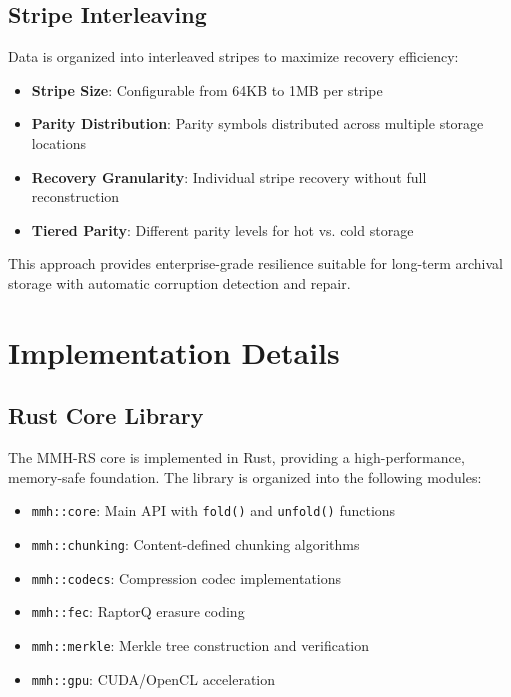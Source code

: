 \documentclass[11pt,a4paper]{article}
\begin{document}
	\subsection{Stripe Interleaving}
	
	Data is organized into interleaved stripes to maximize recovery efficiency:
	\begin{itemize}
		\item \textbf{Stripe Size}: Configurable from 64KB to 1MB per stripe
		\item \textbf{Parity Distribution}: Parity symbols distributed across multiple storage locations
		\item \textbf{Recovery Granularity}: Individual stripe recovery without full reconstruction
		\item \textbf{Tiered Parity}: Different parity levels for hot vs. cold storage
	\end{itemize}
	
	This approach provides enterprise-grade resilience suitable for long-term archival storage with automatic corruption detection and repair.
	
	\section{Implementation Details}
	\label{sec:implementation}
	\subsection{Rust Core Library}
	
	The MMH-RS core is implemented in Rust, providing a high-performance, memory-safe foundation. The library is organized into the following modules:
	
	\begin{itemize}
		\item \texttt{mmh::core}: Main API with \texttt{fold()} and \texttt{unfold()} functions
		\item \texttt{mmh::chunking}: Content-defined chunking algorithms
		\item \texttt{mmh::codecs}: Compression codec implementations
		\item \texttt{mmh::fec}: RaptorQ erasure coding
		\item \texttt{mmh::merkle}: Merkle tree construction and verification
		\item \texttt{mmh::gpu}: CUDA/OpenCL acceleration
	\end{itemize}
	
\end{document}
